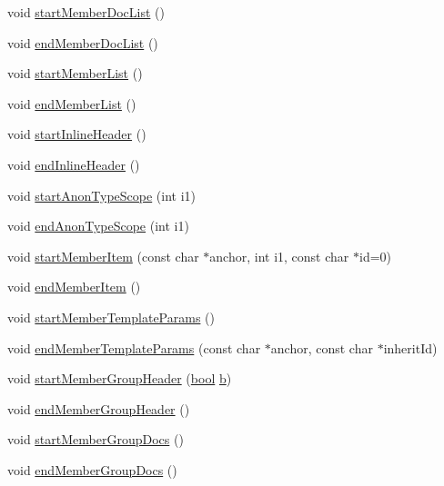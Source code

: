 \begin{DoxyCompactItemize}
\item 
void \hyperlink{class_output_list_ada069f601f0651010bc78b3ccb0f6f11}{start\+Member\+Doc\+List} ()
\item 
void \hyperlink{class_output_list_a65672c5fa7d9f56208917e3d4b8e1895}{end\+Member\+Doc\+List} ()
\item 
void \hyperlink{class_output_list_a7431bc4b23642f75af48f25a415d4ec8}{start\+Member\+List} ()
\item 
void \hyperlink{class_output_list_a7c8d844390c3ab106b675144baa48fc7}{end\+Member\+List} ()
\item 
void \hyperlink{class_output_list_a8e3c4abdce2bc3800e782a435db5437f}{start\+Inline\+Header} ()
\item 
void \hyperlink{class_output_list_a38e8c68dc35efa5e22e9152f25d8b4eb}{end\+Inline\+Header} ()
\item 
void \hyperlink{class_output_list_a74d52604537a67d666ce88405c23dc49}{start\+Anon\+Type\+Scope} (int i1)
\item 
void \hyperlink{class_output_list_acd5534bf6194d070548a92fae1438f71}{end\+Anon\+Type\+Scope} (int i1)
\item 
void \hyperlink{class_output_list_ae6c475a500a360a62e4d0ec8132445ea}{start\+Member\+Item} (const char $\ast$anchor, int i1, const char $\ast$id=0)
\item 
void \hyperlink{class_output_list_a5a5aff841b0f9609a1d73ed5ad6e0f34}{end\+Member\+Item} ()
\item 
void \hyperlink{class_output_list_af5a6611d3aa4b11eafd0a785d1757483}{start\+Member\+Template\+Params} ()
\item 
void \hyperlink{class_output_list_adbb1f7c76e08d42cf1ecba1ca32440ce}{end\+Member\+Template\+Params} (const char $\ast$anchor, const char $\ast$inherit\+Id)
\item 
void \hyperlink{class_output_list_a04ed9f8df2b249675a1788eee8cd97aa}{start\+Member\+Group\+Header} (\hyperlink{qglobal_8h_a1062901a7428fdd9c7f180f5e01ea056}{bool} \hyperlink{060__command__switch_8tcl_a68bdb74c144118d936931c46f75d4b3e}{b})
\item 
void \hyperlink{class_output_list_ac13352584de9c19dd2776d49c1e9bf30}{end\+Member\+Group\+Header} ()
\item 
void \hyperlink{class_output_list_ac78054f50bad730b62b3456699d9a350}{start\+Member\+Group\+Docs} ()
\item 
void \hyperlink{class_output_list_a3cf86cdcd2fb2e853a0bd5be6edb1858}{end\+Member\+Group\+Docs} ()
\item 

\end{DoxyCompactItemize}
